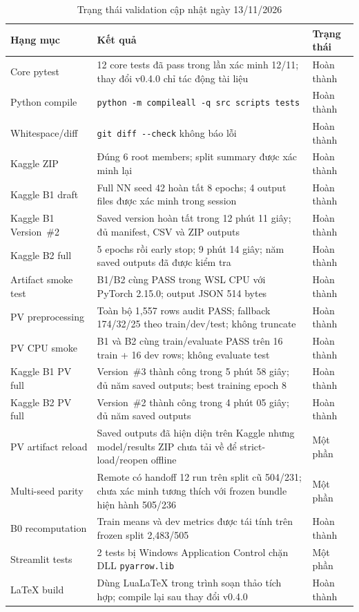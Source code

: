 \documentclass[11pt,a4paper]{article}
\newcommand{\code}[1]{\nolinkurl{#1}}
\newcommand{\statusok}{\textcolor{green!45!black}{Hoàn thành}}
\newcommand{\statuspartial}{\textcolor{orange!75!black}{Một phần}}
\begin{document}
\begin{table}[htbp]
\centering
\caption{Trạng thái validation cập nhật ngày 13/11/2026}
\small
\begin{tabularx}{\textwidth}{@{}p{}Yp{0.16\textwidth}@{}}
\toprule
Hạng mục & Kết quả & Trạng thái \\
\midrule
Core pytest & 12 core tests đã pass trong lần xác minh 12/11; thay đổi v0.4.0 chỉ tác động tài liệu & \statusok \\
Python compile & \code{python -m compileall -q src scripts tests} & \statusok \\
Whitespace/diff & \code{git diff --check} không báo lỗi & \statusok \\
Kaggle ZIP & Đúng 6 root members; split summary được xác minh lại & \statusok \\
Kaggle B1 draft & Full NN seed 42 hoàn tất 8 epochs; 4 output files được xác minh trong session & \statusok \\
Kaggle B1 Version~\#2 & Saved version hoàn tất trong 12 phút 11 giây; đủ manifest, CSV và ZIP outputs & \statusok \\
Kaggle B2 full & 5 epochs rồi early stop; 9 phút 14 giây; năm saved outputs đã được kiểm tra & \statusok \\
Artifact smoke test & B1/B2 cùng PASS trong WSL CPU với PyTorch 2.15.0; output JSON 514 bytes & \statusok \\
PV preprocessing & Toàn bộ 1,557 rows audit PASS; fallback 174/32/25 theo train/dev/test; không truncate & \statusok \\
PV CPU smoke & B1 và B2 cùng train/evaluate PASS trên 16 train + 16 dev rows; không evaluate test & \statusok \\
Kaggle B1 PV full & Version~\#3 thành công trong 5 phút 58 giây; đủ năm saved outputs; best training epoch 8 & \statusok \\
Kaggle B2 PV full & Version~\#2 thành công trong 4 phút 05 giây; đủ năm saved outputs & \statusok \\
PV artifact reload & Saved outputs đã hiện diện trên Kaggle nhưng model/results ZIP chưa tải về để strict-load/reopen offline & \statuspartial \\
Multi-seed parity & Remote có handoff 12 run trên split cũ 504/231; chưa xác minh tương thích với frozen bundle hiện hành 505/236 & \statuspartial \\
B0 recomputation & Train means và dev metrics được tái tính trên frozen split 2,483/505 & \statusok \\
Streamlit tests & 2 tests bị Windows Application Control chặn DLL \code{pyarrow.lib} & \statuspartial \\
LaTeX build & Dùng LuaLaTeX trong trình soạn thảo tích hợp; compile lại sau thay đổi v0.4.0 & \statusok \\
\bottomrule
\end{tabularx}
\end{table}
\end{document}

